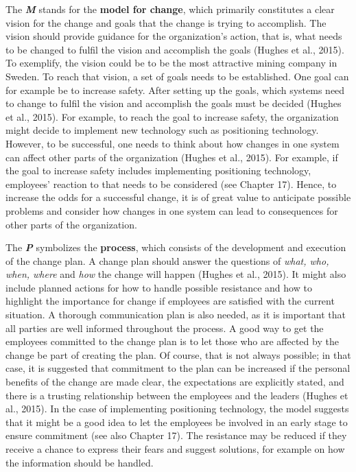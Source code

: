 \documentclass[
  12pt,
]{scrbook}
\begin{document}
The \textbf{\emph{M}} stands for the \textbf{model for change}, which primarily constitutes a clear vision for the change and goals that the change is trying to accomplish. The vision should provide guidance for the organization's action, that is, what needs to be changed to fulfil the vision and accomplish the goals (Hughes et al., 2015). To exemplify, the vision could be to be the most attractive mining company in Sweden. To reach that vision, a set of goals needs to be established. One goal can for example be to increase safety. After setting up the goals, which systems need to change to fulfil the vision and accomplish the goals must be decided (Hughes et al., 2015). For example, to reach the goal to increase safety, the organization might decide to implement new technology such as positioning technology. However, to be successful, one needs to think about how changes in one system can affect other parts of the organization (Hughes et al., 2015). For example, if the goal to increase safety includes implementing positioning technology, employees' reaction to that needs to be considered (see Chapter 17). Hence, to increase the odds for a successful change, it is of great value to anticipate possible problems and consider how changes in one system can lead to consequences for other parts of the organization.

The \textbf{\emph{P}} symbolizes the \textbf{process}, which consists of the development and execution of the change plan. A change plan should answer the questions of \emph{what, who, when, where} and \emph{how} the change will happen (Hughes et al., 2015). It might also include planned actions for how to handle possible resistance and how to highlight the importance for change if employees are satisfied with the current situation. A thorough communication plan is also needed, as it is important that all parties are well informed throughout the process. A good way to get the employees committed to the change plan is to let those who are affected by the change be part of creating the plan. Of course, that is not always possible; in that case, it is suggested that commitment to the plan can be increased if the personal benefits of the change are made clear, the expectations are explicitly stated, and there is a trusting relationship between the employees and the leaders (Hughes et al., 2015). In the case of implementing positioning technology, the model suggests that it might be a good idea to let the employees be involved in an early stage to ensure commitment (see also Chapter 17). The resistance may be reduced if they receive a chance to express their fears and suggest solutions, for example on how the information should be handled.
\end{document}
